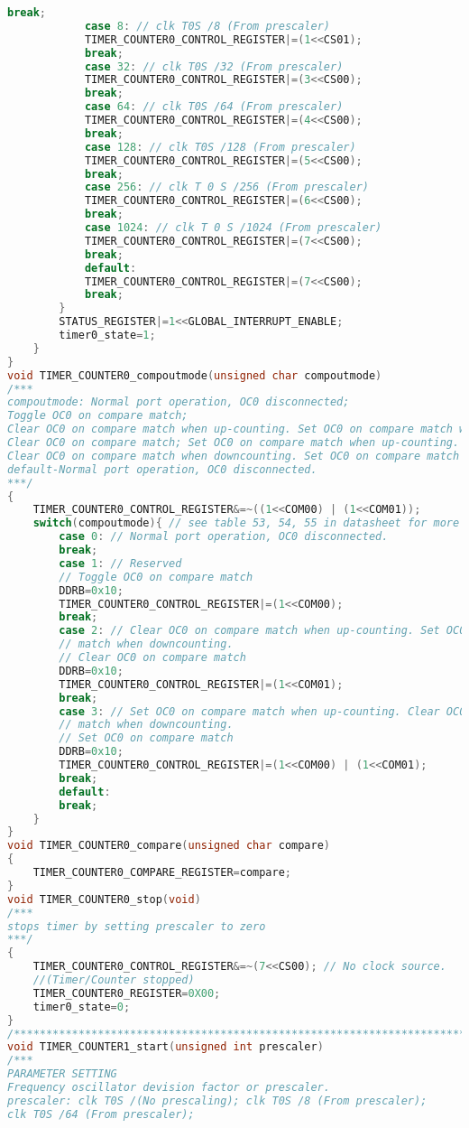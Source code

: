 \begin{lstlisting}[language=C, caption={atmega128timer.c}, label=atmega128timer-c, captionpos=b]
			break;
			case 8: // clk T0S /8 (From prescaler)
			TIMER_COUNTER0_CONTROL_REGISTER|=(1<<CS01);
			break;
			case 32: // clk T0S /32 (From prescaler)
			TIMER_COUNTER0_CONTROL_REGISTER|=(3<<CS00);
			break;
			case 64: // clk T0S /64 (From prescaler)
			TIMER_COUNTER0_CONTROL_REGISTER|=(4<<CS00);
			break;
			case 128: // clk T0S /128 (From prescaler)
			TIMER_COUNTER0_CONTROL_REGISTER|=(5<<CS00);
			break;
			case 256: // clk T 0 S /256 (From prescaler)
			TIMER_COUNTER0_CONTROL_REGISTER|=(6<<CS00);
			break;
			case 1024: // clk T 0 S /1024 (From prescaler)
			TIMER_COUNTER0_CONTROL_REGISTER|=(7<<CS00);
			break;
			default:
			TIMER_COUNTER0_CONTROL_REGISTER|=(7<<CS00);
			break;
		}
		STATUS_REGISTER|=1<<GLOBAL_INTERRUPT_ENABLE;
		timer0_state=1;
	}	
}
void TIMER_COUNTER0_compoutmode(unsigned char compoutmode)
/***
compoutmode: Normal port operation, OC0 disconnected;
Toggle OC0 on compare match; 
Clear OC0 on compare match when up-counting. Set OC0 on compare match when downcounting.
Clear OC0 on compare match; Set OC0 on compare match when up-counting.
Clear OC0 on compare match when downcounting. Set OC0 on compare match ;
default-Normal port operation, OC0 disconnected.
***/
{
	TIMER_COUNTER0_CONTROL_REGISTER&=~((1<<COM00) | (1<<COM01));
	switch(compoutmode){ // see table 53, 54, 55 in datasheet for more information
		case 0: // Normal port operation, OC0 disconnected.
		break;
		case 1: // Reserved
		// Toggle OC0 on compare match
		DDRB=0x10;
		TIMER_COUNTER0_CONTROL_REGISTER|=(1<<COM00);
		break;
		case 2: // Clear OC0 on compare match when up-counting. Set OC0 on compare
		// match when downcounting.
		// Clear OC0 on compare match
		DDRB=0x10;
		TIMER_COUNTER0_CONTROL_REGISTER|=(1<<COM01);
		break;
		case 3: // Set OC0 on compare match when up-counting. Clear OC0 on compare
		// match when downcounting.
		// Set OC0 on compare match
		DDRB=0x10;
		TIMER_COUNTER0_CONTROL_REGISTER|=(1<<COM00) | (1<<COM01);
		break;
		default:
		break;
	}
}
void TIMER_COUNTER0_compare(unsigned char compare)
{
	TIMER_COUNTER0_COMPARE_REGISTER=compare;
}
void TIMER_COUNTER0_stop(void)
/***
stops timer by setting prescaler to zero
***/
{
	TIMER_COUNTER0_CONTROL_REGISTER&=~(7<<CS00); // No clock source.
	//(Timer/Counter stopped)
	TIMER_COUNTER0_REGISTER=0X00;
	timer0_state=0;
}
/*****************************************************************************************/
void TIMER_COUNTER1_start(unsigned int prescaler)
/***
PARAMETER SETTING
Frequency oscillator devision factor or prescaler.
prescaler: clk T0S /(No prescaling); clk T0S /8 (From prescaler);
clk T0S /64 (From prescaler);

\end{lstlisting}
